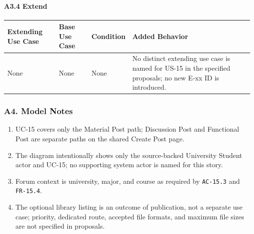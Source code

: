 \documentclass[12pt]{article}
\renewcommand{\baselinestretch}{1.5}
\begin{document}
\hypertarget{sec:a3-4-extend}{}
\paragraph*{A3.4 Extend}
\par\medskip

\begingroup
\small
\renewcommand{\baselinestretch}{1.0}\selectfont
\renewcommand{\arraystretch}{1.15}
\setlength{\tabcolsep}{6pt}
\begin{longtable}{|>{\raggedright\arraybackslash}p{}|>{\raggedright\arraybackslash}p{}|>{\raggedright\arraybackslash}p{}|>{\raggedright\arraybackslash}p{}|}
\hline
\textbf{Extending Use Case} & \textbf{Base Use Case} & \textbf{Condition} & \textbf{Added Behavior} \\ \hline
\endhead
None & None & None & No distinct extending use case is named for US-15 in the specified proposals; no new E-xx ID is introduced. \\ \hline
\end{longtable}
\endgroup
\par\medskip

\hypertarget{sec:a4-model-notes}{}
\subsubsection*{A4. Model Notes}
\par\medskip

\begin{enumerate}
\item UC-15 covers only the Material Post path; Discussion Post and Functional Post are separate paths on the shared Create Post page.
\item The diagram intentionally shows only the source-backed University Student actor and UC-15; no supporting system actor is named for this story.
\item Forum context is university, major, and course as required by \texttt{AC-15.3} and \texttt{FR-15.4}.
\item The optional library listing is an outcome of publication, not a separate use case; priority, dedicated route, accepted file formats, and maximum file sizes are not specified in proposals.
\end{enumerate}
\par\medskip

\hypertarget{sec:part-b-use-case-specification}{}
\end{document}
